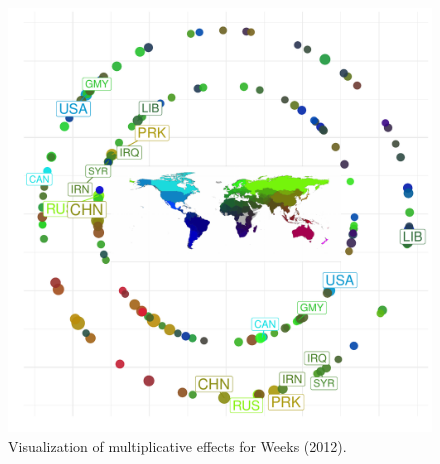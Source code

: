 \begin{figure}[!h]
	\includegraphics[width=\textwidth]{weeks_circPlot.pdf}
	\caption{\label{fig:weekscirc} Visualization of multiplicative effects for Weeks (2012). 
	}
\end{figure}
\FloatBarrier

